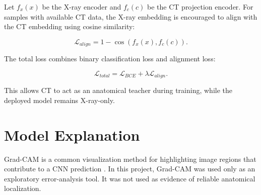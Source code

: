Let $f_x(x)$ be the X-ray encoder and $f_c(c)$ be the CT projection encoder. For samples with available CT data, the X-ray embedding is encouraged to align with the CT embedding using cosine similarity:

\begin{equation}
    \mathcal{L}_{align} = 1 - \cos(f_x(x), f_c(c)).
\end{equation}

The total loss combines binary classification loss and alignment loss:

\begin{equation}
    \mathcal{L}_{total} = \mathcal{L}_{BCE} + \lambda \mathcal{L}_{align}.
\end{equation}

This allows CT to act as an anatomical teacher during training, while the deployed model remains X-ray-only.

\section{Model Explanation}
Grad-CAM is a common visualization method for highlighting image regions that contribute to a CNN prediction \cite{selvaraju2017gradcam}. In this project, Grad-CAM was used only as an exploratory error-analysis tool. It was not used as evidence of reliable anatomical localization.
